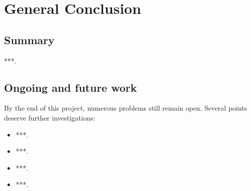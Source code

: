 \chapter*{General Conclusion}
{}

\section*{Summary}
***.

\section*{Ongoing and future work}
By the end of this project, numerous problems still remain open. Several points deserve further investigations:

\begin{itemize}[label = \scriptsize$\blacktriangleright$]
\item ***.
\item ***.
\item ***.
\item ***.
\end{itemize}